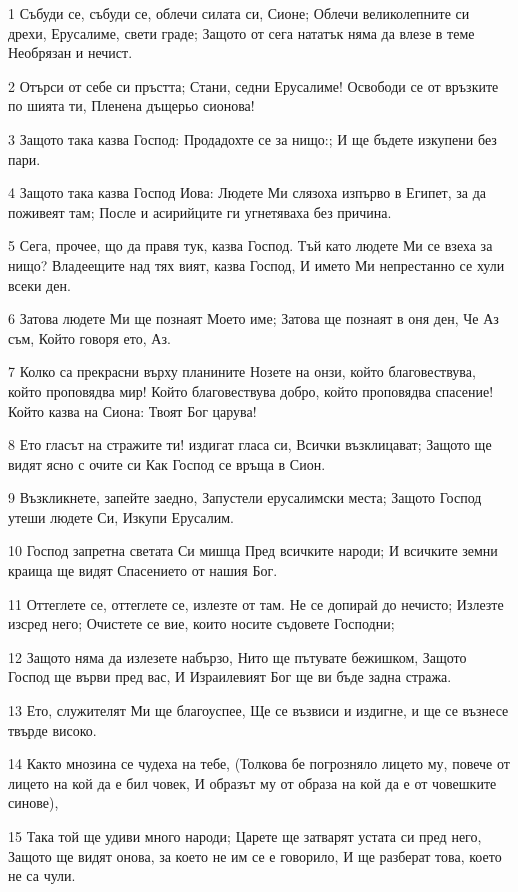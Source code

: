 \par 1 Събуди се, събуди се, облечи силата си, Сионе; Облечи великолепните си дрехи, Ерусалиме, свети граде; Защото от сега нататък няма да влезе в теме Необрязан и нечист.
\par 2 Отърси от себе си пръстта; Стани, седни Ерусалиме! Освободи се от връзките по шията ти, Пленена дъщерьо сионова!
\par 3 Защото така казва Господ: Продадохте се за нищо:; И ще бъдете изкупени без пари.
\par 4 Защото така казва Господ Иова: Людете Ми слязоха изпърво в Египет, за да поживеят там; После и асирийците ги угнетяваха без причина.
\par 5 Сега, прочее, що да правя тук, казва Господ. Тъй като людете Ми се взеха за нищо? Владеещите над тях вият, казва Господ, И името Ми непрестанно се хули всеки ден.
\par 6 Затова людете Ми ще познаят Моето име; Затова ще познаят в оня ден, Че Аз съм, Който говоря ето, Аз.
\par 7 Колко са прекрасни върху планините Нозете на онзи, който благовествува, който проповядва мир! Който благовествува добро, който проповядва спасение! Който казва на Сиона: Твоят Бог царува!
\par 8 Ето гласът на стражите ти! издигат гласа си, Всички възклицават; Защото ще видят ясно с очите си Как Господ се връща в Сион.
\par 9 Възкликнете, запейте заедно, Запустели ерусалимски места; Защото Господ утеши людете Си, Изкупи Ерусалим.
\par 10 Господ запретна светата Си мишца Пред всичките народи; И всичките земни краища ще видят Спасението от нашия Бог.
\par 11 Оттеглете се, оттеглете се, излезте от там. Не се допирай до нечисто; Излезте изсред него; Очистете се вие, които носите съдовете Господни;
\par 12 Защото няма да излезете набързо, Нито ще пътувате бежишком, Защото Господ ще върви пред вас, И Израилевият Бог ще ви бъде задна стража.
\par 13 Ето, служителят Ми ще благоуспее, Ще се възвиси и издигне, и ще се възнесе твърде високо.
\par 14 Както мнозина се чудеха на тебе, (Толкова бе погрозняло лицето му, повече от лицето на кой да е бил човек, И образът му от образа на кой да е от човешките синове),
\par 15 Така той ще удиви много народи; Царете ще затварят устата си пред него, Защото ще видят онова, за което не им се е говорило, И ще разберат това, което не са чули.

